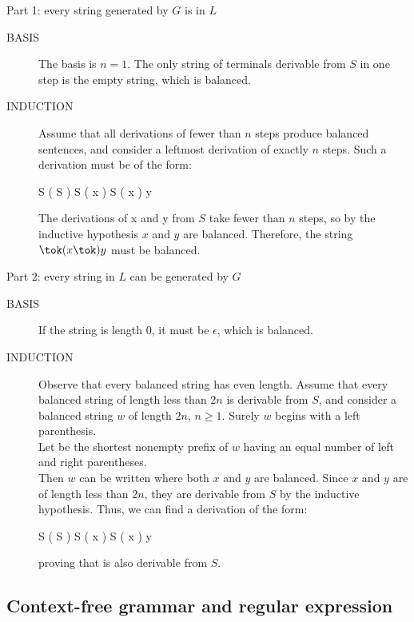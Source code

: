 \begin{bibunit}[apalike]
\begin{frame}{Part 1: every string generated by $G$ is in $L$}
	\begin{description}
	\item[BASIS] The basis is $n=1$. The only string of terminals derivable from $S$ in one step is the empty string, which is balanced.
	\item[INDUCTION] Assume that all derivations of fewer than $n$ steps produce balanced sentences, and consider a leftmost derivation of exactly $n$ steps. Such a derivation must be of the form:
		\begin{center}\bnfstyle S \derivlm \tok( S \tok) S \derivlm \tok( x \tok) S \derivlm \tok( x \tok) y\end{center}
		The derivations of x and y from $S$ take fewer than $n$ steps, so by the inductive hypothesis $x$ and $y$ are balanced. Therefore, the string $\tok(x\tok)y$ must be balanced.
	\end{description}
\end{frame}

\begin{frame}{Part 2: every string in $L$ can be generated by $G$}
	\begin{description}
	\item[BASIS] If the string is length $0$, it must be $\epsilon$, which is balanced.
	\item[INDUCTION] Observe that every balanced string has even length. Assume that every balanced string of length less than $2n$ is derivable from $S$, and consider a balanced string $w$ of length $2n$, $n\ge1$. Surely $w$ begins with a left parenthesis. \\
		Let  be the shortest nonempty prefix of $w$ having an equal number of left and right parentheses. \\
		Then $w$ can be written  where both $x$ and $y$ are balanced. Since $x$ and $y$ are of length less than $2n$, they are derivable from $S$ by the inductive hypothesis. Thus, we can find a derivation of the form:
			\begin{center}\bnfstyle S \deriv \tok( S \tok) S \seqderiv \tok( x \tok) S \seqderiv \tok( x \tok) y\end{center}
		proving that  is also derivable from $S$.
	\end{description}
\end{frame}

\subsection{Context-free grammar and regular expression}


\end{bibunit}
